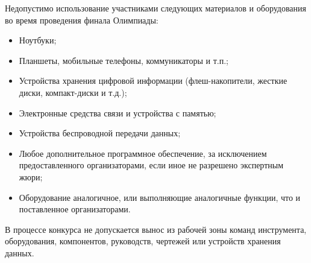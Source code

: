 Недопустимо использование участниками следующих материалов и оборудования во время проведения финала Олимпиады:
\begin{itemize}
    \item Ноутбуки;
    \item Планшеты, мобильные телефоны, коммуникаторы и т.п.;
    \item Устройства хранения цифровой информации (флеш-накопители, жесткие диски, компакт-диски и т.д.);
    \item Электронные средства связи и устройства с памятью;
    \item Устройства беспроводной передачи данных;
    \item Любое дополнительное программное обеспечение, за исключением предоставленного организаторами, если иное не разрешено экспертным жюри;
    \item Оборудование аналогичное, или выполняющие аналогичные функции, что и поставленное организаторами.
\end{itemize}

В процессе конкурса не допускается вынос из рабочей зоны команд инструмента, оборудования, компонентов, руководств, чертежей или устройств хранения данных.

